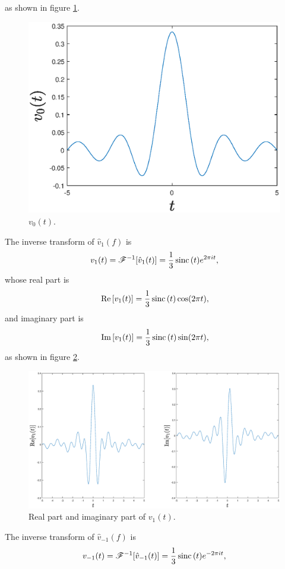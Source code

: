 \documentclass{assignment}
\begin{document}
\begin{sol}
\begin{itemize}
        as shown in figure \ref{A-8-P-6-v0(t)}.
        \begin{figure}[H]
            \centering
            \includegraphics[width=.4\columnwidth]{A-8-P-6-v0(t).eps}
            \caption{$v_0(t)$.}
            \label{A-8-P-6-v0(t)}
        \end{figure}
        The inverse transform of $\hat{v}_1(f)$ is
        \begin{align}
            v_1(t)=\mathscr{F}^{-1}[\hat{v}_1(t)]=\frac{1}{3}\,\text{sinc}\,(t)e^{2\pi it},
        \end{align}
        whose real part is
        \begin{align}
            \,\text{Re}\,[v_1(t)]=\frac{1}{3}\,\text{sinc}\,(t)\cos(2\pi t),
        \end{align}
        and imaginary part is
        \begin{align}
            \,\text{Im}\,[v_1(t)]=\frac{1}{3}\,\text{sinc}\,(t)\sin(2\pi t),
        \end{align}
        as shown in figure \ref{A-8-P-6-v1(t)}.
        \begin{figure}[H]
            \centering
            \includegraphics[width=.9\columnwidth]{A-8-P-6-v1(t).eps}
            \caption{Real part and imaginary part of $v_1(t)$.}
            \label{A-8-P-6-v1(t)}
        \end{figure}
        The inverse transform of $\hat{v}_{-1}(f)$ is
        \begin{align}
            v_{-1}(t)=\mathscr{F}^{-1}[\hat{v}_{-1}(t)]=\frac{1}{3}\sinc(t)e^{-2\pi it},

\end{align}
\end{itemize}
\end{sol}
\end{document}
